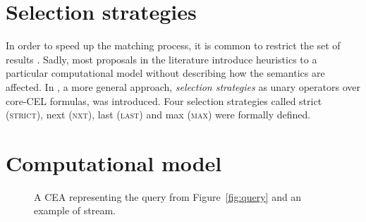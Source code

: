 \section{Selection strategies}\label{sec:selection_strategies}

In order to speed up the matching process, it is common to restrict the set of results \cite{selection-strategies-literature-1,selection-strategies-literature-2,selection-strategies-literature-3}. Sadly, most proposals in the literature introduce heuristics to a particular computational model without describing how the semantics are affected. In \cite{formal-framework-cer}, a more general approach, \emph{selection strategies} as unary operators over core-CEL formulas, was introduced. Four selection strategies called strict (\textsc{strict}), next (\textsc{nxt}), last (\textsc{last}) and max (\textsc{max}) were formally defined.

\section{Computational model}\label{sec:cea}

\begin{figure}[H]
  \centering
  \begin{subfigure}[b]{\textwidth}
    \centering
    \vspace*{2em}
  \end{subfigure}
  \begin{subfigure}[t]{\textwidth}
    \centering
  \end{subfigure}

  \caption{A CEA representing the query from Figure~\ref{fig:query} and an example of stream.}
  \label{fig:cea}
\end{figure}

